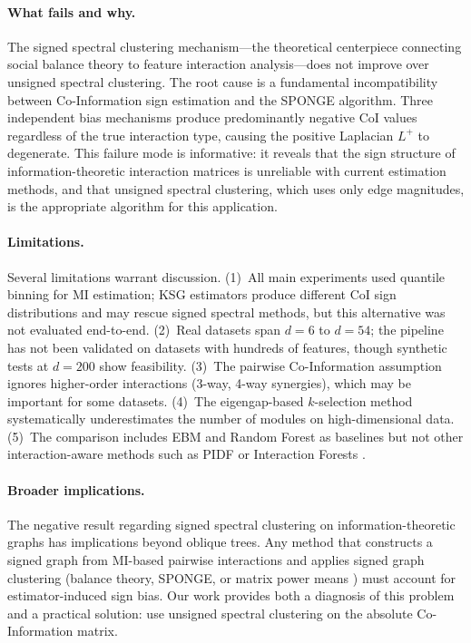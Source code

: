 \documentclass[11pt,letterpaper]{article}
\begin{document}
\paragraph{What fails and why.} The signed spectral clustering mechanism---the theoretical centerpiece connecting social balance theory to feature interaction analysis---does not improve over unsigned spectral clustering. The root cause is a fundamental incompatibility between Co-Information sign estimation and the SPONGE algorithm. Three independent bias mechanisms produce predominantly negative CoI values regardless of the true interaction type, causing the positive Laplacian $L^+$ to degenerate. This failure mode is informative: it reveals that the sign structure of information-theoretic interaction matrices is unreliable with current estimation methods, and that unsigned spectral clustering, which uses only edge magnitudes, is the appropriate algorithm for this application.

\paragraph{Limitations.} Several limitations warrant discussion. (1)~All main experiments used quantile binning for MI estimation; KSG estimators produce different CoI sign distributions and may rescue signed spectral methods, but this alternative was not evaluated end-to-end. (2)~Real datasets span $d{=}6$ to $d{=}54$; the pipeline has not been validated on datasets with hundreds of features, though synthetic tests at $d{=}200$ show feasibility. (3)~The pairwise Co-Information assumption ignores higher-order interactions (3-way, 4-way synergies), which may be important for some datasets. (4)~The eigengap-based $k$-selection method systematically underestimates the number of modules on high-dimensional data. (5)~The comparison includes EBM and Random Forest as baselines but not other interaction-aware methods such as PIDF \citep{Westphal2025} or Interaction Forests \citep{Hornung2022}.

\paragraph{Broader implications.} The negative result regarding signed spectral clustering on information-theoretic graphs has implications beyond oblique trees. Any method that constructs a signed graph from MI-based pairwise interactions and applies signed graph clustering (balance theory, SPONGE, or matrix power means \citep{Mercado2019}) must account for estimator-induced sign bias. Our work provides both a diagnosis of this problem and a practical solution: use unsigned spectral clustering on the absolute Co-Information matrix.
\end{document}
